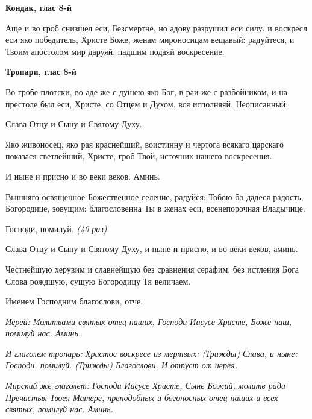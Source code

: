 \bfseries Кондак, глас 8-й\normalfont{}


Аще и во гроб снизшел еси, Безсмертне, но адову разрушил еси силу, и воскресл еси яко победитель, Христе Боже, женам мироносицам вещавый: радуйтеся, и Твоим апостолом мир даруяй, падшим подаяй воскресение.





\bfseries Тропари, глас 8-й\normalfont{}


Во гробе плотски, во аде же с душею яко Бог, в раи же с разбойником, и на престоле был еси, Христе, со Отцем и Духом, вся исполняяй, Неописанный.


Слава Отцу и Сыну и Святому Духу.


Яко живоносец, яко рая краснейший, воистинну и чертога всякаго царскаго показася светлейший, Христе, гроб Твой, источник нашего воскресения.


И ныне и присно и во веки веков. Аминь.


Вышняго освященное Божественное селение, радуйся: Тобою бо дадеся радость, Богородице, зовущим: благословенна Ты в женах еси, всенепорочная Владычице.


Господи, помилуй. \itshape (40 раз)\normalfont{}


Слава Отцу и Сыну и Святому Духу, и ныне и присно, и во веки веков, аминь.


Честнейшую херувим и славнейшую без сравнения серафим, без истления Бога Слова рождшую, сущую Богородицу Тя величаем.


Именем Господним благослови, отче.


\itshape Иерей:\normalfont{} Молитвами святых отец наших, Господи Иисусе Христе, Боже наш, помилуй нас. Аминь.


\itshape И глаголем тропарь:\normalfont{} Христос воскресе из мертвых: \itshape (Трижды)\normalfont{} \itshape Слава, и ныне:\normalfont{} Господи, помилуй. \itshape (Трижды)\normalfont{} Благослови. \itshape И отпуст от иерея.\normalfont{}


\itshape Мирский же глаголет:\normalfont{} Господи Иисусе Христе, Сыне Божий, молитв ради Пречистыя Твоея Матере, преподобных и богоносных отец наших и всех святых, помилуй нас. Аминь.




\mychapterending